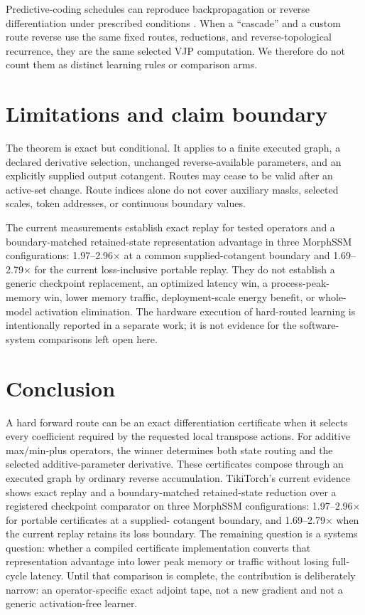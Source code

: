 \documentclass[10pt]{article}
\begin{document}
Predictive-coding schedules can reproduce backpropagation or reverse
differentiation under prescribed conditions
\citep{song2020exactpc,salvatori2022reverse,millidge2022arbitrary}.  When a
``cascade'' and a custom route reverse use the same fixed routes, reductions,
and reverse-topological recurrence, they are the same selected VJP computation.
We therefore do not count them as distinct learning rules or comparison arms.

\section{Limitations and claim boundary}

The theorem is exact but conditional.  It applies to a finite executed graph,
a declared derivative selection, unchanged reverse-available parameters, and
an explicitly supplied output cotangent.  Routes may cease to be valid after
an active-set change.  Route indices alone do not cover auxiliary masks,
selected scales, token addresses, or continuous boundary values.

The current measurements establish exact replay for tested operators and a
boundary-matched retained-state representation advantage in three MorphSSM
configurations: 1.97--2.96$\times$ at a common supplied-cotangent boundary and
1.69--2.79$\times$ for the current loss-inclusive portable replay.
They do not establish a generic checkpoint replacement, an optimized latency
win, a process-peak-memory win, lower memory traffic, deployment-scale energy
benefit, or whole-model activation elimination.  The hardware execution of
hard-routed learning is intentionally reported in a separate work; it is not
evidence for the software-system comparisons left open here.

\section{Conclusion}

A hard forward route can be an exact differentiation certificate when it
selects every coefficient required by the requested local transpose actions.
For additive max/min-plus operators, the winner determines both state routing
and the selected additive-parameter derivative.  These certificates compose
through an executed graph by ordinary reverse accumulation.  TikiTorch's
current evidence shows exact replay and a boundary-matched retained-state
reduction over a registered checkpoint comparator on three MorphSSM
configurations: 1.97--2.96$\times$ for portable certificates at a supplied-
cotangent boundary, and 1.69--2.79$\times$ when the current replay retains its
loss boundary.  The remaining question is a systems question: whether a
compiled certificate implementation converts that representation advantage
into lower peak memory or traffic without losing full-cycle latency.  Until
that comparison is complete, the contribution is deliberately narrow: an
operator-specific exact adjoint tape, not a new gradient and not a generic
activation-free learner.
\end{document}
